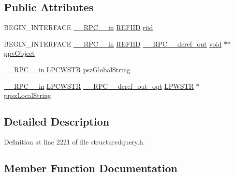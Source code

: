 \subsection*{Public Attributes}
\begin{DoxyCompactItemize}
\item 
B\+E\+G\+I\+N\+\_\+\+I\+N\+T\+E\+R\+F\+A\+CE \hyperlink{rpcsal_8h_a20b7f6da600a05c8b541659f14f7f0e6}{\+\_\+\+\_\+\+R\+P\+C\+\_\+\+\_\+in} \hyperlink{px__win__ds_8c_a80ec49c8ae61e234197d5071d2df497d}{R\+E\+F\+I\+ID} \hyperlink{struct_i_schema_localizer_support_vtbl_a18dd6d8313c5ab9b608902591bf9ebd8}{riid}
\item 
B\+E\+G\+I\+N\+\_\+\+I\+N\+T\+E\+R\+F\+A\+CE \hyperlink{rpcsal_8h_a20b7f6da600a05c8b541659f14f7f0e6}{\+\_\+\+\_\+\+R\+P\+C\+\_\+\+\_\+in} \hyperlink{px__win__ds_8c_a80ec49c8ae61e234197d5071d2df497d}{R\+E\+F\+I\+ID} \hyperlink{rpcsal_8h_a23bc188526f10656f9c79d950f6c3192}{\+\_\+\+\_\+\+R\+P\+C\+\_\+\+\_\+deref\+\_\+out} \hyperlink{sound_8c_ae35f5844602719cf66324f4de2a658b3}{void} $\ast$$\ast$ \hyperlink{struct_i_schema_localizer_support_vtbl_a7910c2ee008371684090269dd3f8d985}{ppv\+Object}
\item 
\hyperlink{rpcsal_8h_a20b7f6da600a05c8b541659f14f7f0e6}{\+\_\+\+\_\+\+R\+P\+C\+\_\+\+\_\+in} \hyperlink{mapinls_8h_a25fda90f83ded0efd5456a4e7eda1e0c}{L\+P\+C\+W\+S\+TR} \hyperlink{struct_i_schema_localizer_support_vtbl_ac5913a71b778df0daacab45ed2125d6c}{psz\+Global\+String}
\item 
\hyperlink{rpcsal_8h_a20b7f6da600a05c8b541659f14f7f0e6}{\+\_\+\+\_\+\+R\+P\+C\+\_\+\+\_\+in} \hyperlink{mapinls_8h_a25fda90f83ded0efd5456a4e7eda1e0c}{L\+P\+C\+W\+S\+TR} \hyperlink{rpcsal_8h_ab29e89ceb0eb0b075c6f6299b0de6a21}{\+\_\+\+\_\+\+R\+P\+C\+\_\+\+\_\+deref\+\_\+out\+\_\+opt} \hyperlink{mapinls_8h_acc28f72b93422cfd63a60e5a102a77b1}{L\+P\+W\+S\+TR} $\ast$ \hyperlink{struct_i_schema_localizer_support_vtbl_a4736a2b697561b203de849c58104b066}{ppsz\+Local\+String}
\end{DoxyCompactItemize}


\subsection{Detailed Description}


Definition at line 2221 of file structuredquery.\+h.



\subsection{Member Function Documentation}
